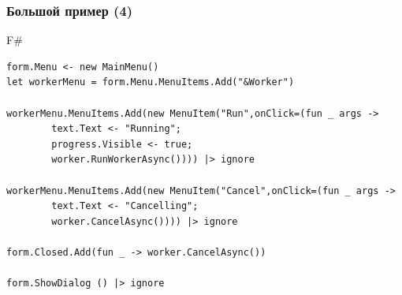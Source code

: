 \documentclass[xetex,mathserif,serif]{beamer}
\begin{document}
    \begin{frame}[fragile]
        \frametitle{Большой пример (4)}
        \begin{exampleblock}{F\#}
            \begin{lstlisting}[basicstyle=\scriptsize]
form.Menu <- new MainMenu()
let workerMenu = form.Menu.MenuItems.Add("&Worker")

workerMenu.MenuItems.Add(new MenuItem("Run",onClick=(fun _ args ->
        text.Text <- "Running";
        progress.Visible <- true;
        worker.RunWorkerAsync()))) |> ignore

workerMenu.MenuItems.Add(new MenuItem("Cancel",onClick=(fun _ args ->
        text.Text <- "Cancelling";
        worker.CancelAsync()))) |> ignore

form.Closed.Add(fun _ -> worker.CancelAsync())

form.ShowDialog () |> ignore
\end{lstlisting}
\end{exampleblock}
\end{frame}
\end{document}
